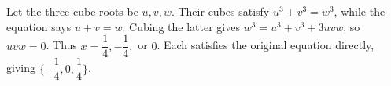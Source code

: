 Let the three cube roots be $u,v,w$. Their cubes satisfy $u^3+v^3=w^3$, while the equation says $u+v=w$. Cubing the latter gives $w^3=u^3+v^3+3uvw$, so $uvw=0$. Thus $x=\dfrac{1}{4},-\dfrac{1}{4},$ or $0$. Each satisfies the original equation directly, giving $\boxed{\{-\dfrac{1}{4},0,\dfrac{1}{4}\}}$.
